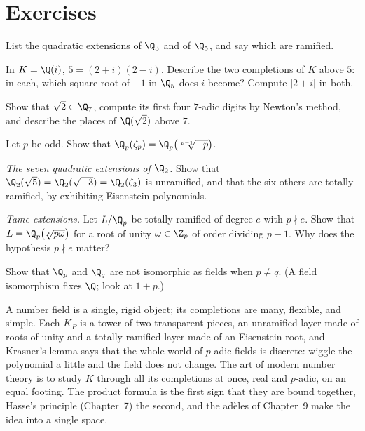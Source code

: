 \section{Exercises}

\begin{exercise}[$\star$]\label{ex:quadQ3}
List the quadratic extensions of $\Q_3$ and of $\Q_5$, and say which are ramified.
\end{exercise}

\begin{exercise}[$\star$]\label{ex:twoplaces}
In $K=\Q(i)$, $5=(2+i)(2-i)$. Describe the two completions of $K$ above $5$: in each, which square root of $-1$ in $\Q_5$
does $i$ become? Compute $|2+i|$ in both.
\end{exercise}

\begin{exercise}[$\star\star$]\label{ex:sqrt2Q7}
Show that $\sqrt2\in\Q_7$, compute its first four $7$-adic digits by Newton's method, and describe the places of $\Q(\sqrt2)$
above $7$.
\end{exercise}

\begin{exercise}[$\star\star$]\label{ex:zetapEis}
Let $p$ be odd. Show that $\Q_p(\zeta_p)=\Q_p\bigl(\sqrt[p-1]{-p}\bigr)$.
\end{exercise}

\begin{exercise}[$\star\star$]\label{ex:seven}
\emph{The seven quadratic extensions of $\Q_2$.} Show that $\Q_2(\sqrt5)=\Q_2(\sqrt{-3})=\Q_2(\zeta_3)$ is unramified, and that
the six others are totally ramified, by exhibiting Eisenstein polynomials.
\end{exercise}

\begin{exercise}[$\star\star\star$]\label{ex:tame}
\emph{Tame extensions.} Let $L/\Q_p$ be totally ramified of degree $e$ with $p\nmid e$. Show that $L=\Q_p\bigl(\sqrt[e]{p\omega}
\bigr)$ for a root of unity $\omega\in\Z_p$ of order dividing $p-1$. Why does the hypothesis $p\nmid e$ matter?
\end{exercise}

\begin{exercise}[$\star\star\star$]\label{ex:QpQq}
Show that $\Q_p$ and $\Q_q$ are not isomorphic as fields when $p\ne q$. (A field isomorphism fixes $\Q$; look at $1+p$.)
\end{exercise}

\begin{beauty}
A number field is a single, rigid object; its completions are many, flexible, and simple. Each $K_P$ is a tower of two
transparent pieces, an unramified layer made of roots of unity and a totally ramified layer made of an Eisenstein root, and
Krasner's lemma says that the whole world of $p$-adic fields is discrete: wiggle the polynomial a little and the field does
not change. The art of modern number theory is to study $K$ through all its completions at once, real and $p$-adic, on an
equal footing. The product formula is the first sign that they are bound together, Hasse's principle (Chapter~7) the
second, and the ad\`eles of Chapter~9 make the idea into a single space.
\end{beauty}


